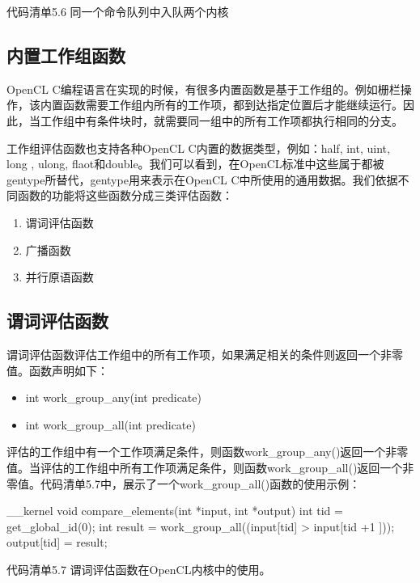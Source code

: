代码清单5.6 同一个命令队列中入队两个内核

\subsection{内置工作组函数}

OpenCL C编程语言在实现的时候，有很多内置函数是基于工作组的。例如栅栏操作，该内置函数需要工作组内所有的工作项，都到达指定位置后才能继续运行。因此，当工作组中有条件块时，就需要同一组中的所有工作项都执行相同的分支。

工作组评估函数也支持各种OpenCL C内置的数据类型，例如：half, int, uint, long , ulong, flaot和double。我们可以看到，在OpenCL标准中这些属于都被gentype所替代，gentype用来表示在OpenCL C中所使用的通用数据。我们依据不同函数的功能将这些函数分成三类评估函数：

\begin{enumerate}
\item 谓词评估函数
\item 广播函数
\item 并行原语函数
\end{enumerate}

\subsection{谓词评估函数}

谓词评估函数评估工作组中的所有工作项，如果满足相关的条件则返回一个非零值。函数声明如下：

\begin{itemize}
\item int work\_\allowbreak{}group\_\allowbreak{}any(int predicate)
\item int work\_\allowbreak{}group\_\allowbreak{}all(int predicate)
\end{itemize}

评估的工作组中有一个工作项满足条件，则函数work\_\allowbreak{}group\_\allowbreak{}any()返回一个非零值。当评估的工作组中所有工作项满足条件，则函数work\_\allowbreak{}group\_\allowbreak{}all()返回一个非零值。代码清单5.7中，展示了一个work\_\allowbreak{}group\_\allowbreak{}all()函数的使用示例：

\begin{codebox}[cpp]
__kernel void compare_elements(int *input, int *output){
  int tid = get_global_id(0);
  int result = work_group_all((input[tid] > input[tid +1 ]));
  output[tid] = result;
}
\end{codebox}

代码清单5.7 谓词评估函数在OpenCL内核中的使用。

